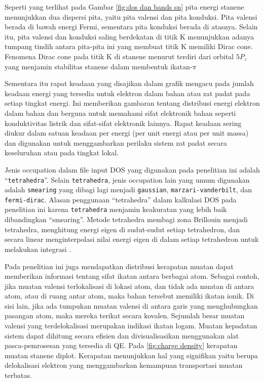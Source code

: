 Seperti yang terlihat pada Gambar \ref{fig:dos dan bands sn} pita energi stanene menunjukkan dua dispersi pita, yaitu pita valensi dan pita konduksi. Pita valensi berada di bawah energi Fermi, sementara pita konduksi berada di atasnya. Selain itu, pita valensi dan konduksi saling berdekatan di titik K menunjukkan adanya tumpang tindih antara pita-pita ini yang membuat titik K memiliki Dirac cone. Fenomena Dirac cone pada titik K di stanene menurut \citep{C6RA26169H} terdiri dari orbital $5P_z$ yang menjamin stabilitas stanene dalam membentuk ikatan-$\pi$

Sementara itu rapat keadaan yang disajikan dalam grafik mengacu pada jumlah keadaan energi yang tersedia untuk elektron dalam bahan atau zat padat pada setiap tingkat energi. Ini memberikan gambaran tentang distribusi energi elektron dalam bahan dan berguna untuk memahami sifat elektronik bahan seperti konduktivitas listrik dan sifat-sifat elektronik lainnya. Rapat keadaan sering diukur dalam satuan keadaan per energi (per unit energi atau per unit massa) dan digunakan untuk menggambarkan perilaku sistem zat padat secara keseluruhan atau pada tingkat lokal.

Jenis occupation dalam file input DOS yang digunakan pada penelitian ini adalah “\texttt{tetrahedra}”. Selain \texttt{tetrahedra}, jenis occupation lain yang umum digunakan adalah \texttt{smearing} yang dibagi lagi menjadi \texttt{gaussian}, \texttt{marzari-vanderbilt}, dan \texttt{fermi-dirac}. Alasan penggunaan “tetrahedra” dalam kalkulasi DOS pada penelitian ini karena \texttt{tetrahedra} menjamin keakuratan yang lebih baik dibandingkan “smearing”. Metode tetrahedra membagi zona Brillouin menjadi tetrahedra, menghitung energi eigen di sudut-sudut setiap tetrahedron, dan secara linear menginterpolasi nilai energi eigen di dalam setiap tetrahedron untuk melakukan integrasi \citep{toriyama2021comparison}.

Pada penelitian ini juga mendapatkan distribusi kerapatan muatan dapat memberikan informasi tentang sifat ikatan antara berbagai atom. Sebagai contoh, jika muatan valensi terlokalisasi di lokasi atom, dan tidak ada muatan di antara atom, atau di ruang antar atom, maka bahan tersebut memiliki ikatan ionik. Di sisi lain, jika ada tumpukan muatan valensi di antara garis yang menghubungkan pasangan atom, maka mereka terikat secara kovalen. Sejumlah besar muatan valensi yang terdelokalisasi merupakan indikasi ikatan logam. Muatan kepadatan sistem dapat dihitung secara efisien dan divisualisasikan menggunakan alat pasca-pemrosesan yang tersedia di QE.
Pada \ref{fig:charge density} kerapatan muatan stanene diplot. Kerapatan menunjukkan hal yang signifikan yaitu berupa delokalisasi elektron yang menggambarkan kemampuan transportasi muatan terbatas.



